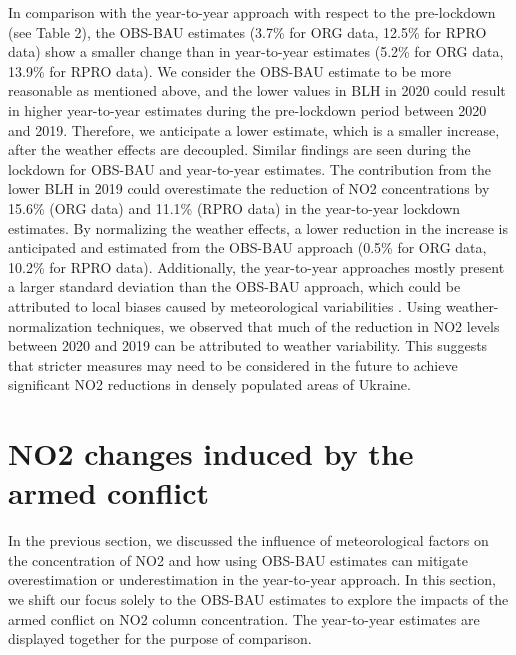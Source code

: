 In comparison with the year-to-year approach with respect to the pre-lockdown (see Table 2), the OBS-BAU estimates (3.7\% for ORG data, 12.5\% for RPRO data) show a smaller change than in year-to-year estimates (5.2\% for ORG data, 13.9\% for RPRO data). We consider the OBS-BAU estimate to be more reasonable as mentioned above, and the lower values in BLH in 2020 could result in higher year-to-year estimates during the pre-lockdown period between 2020 and 2019. Therefore, we anticipate a lower estimate, which is a smaller increase, after the weather effects are decoupled. Similar findings are seen during the lockdown for OBS-BAU and year-to-year estimates. The contribution from the lower BLH in 2019 could overestimate the reduction of NO2 concentrations by 15.6\% (ORG data) and 11.1\% (RPRO data) in the year-to-year lockdown estimates. By normalizing the weather effects, a lower reduction in the increase is anticipated and estimated from the OBS-BAU approach (0.5\% for ORG data, 10.2\% for RPRO data). Additionally, the year-to-year approaches mostly present a larger standard deviation than the OBS-BAU approach, which could be attributed to local biases caused by meteorological variabilities \citep{barre2021estimating}. Using weather-normalization techniques, we observed that much of the reduction in NO2 levels between 2020 and 2019 can be attributed to weather variability. This suggests that stricter measures may need to be considered in the future to achieve significant NO2 reductions in densely populated areas of Ukraine.\par
\section{NO2 changes induced by the armed conflict} \label{chap3_war}
In the previous section, we discussed the influence of meteorological factors on the concentration of NO2 and how using OBS-BAU estimates can mitigate overestimation or underestimation in the year-to-year approach. In this section, we shift our focus solely to the OBS-BAU estimates to explore the impacts of the armed conflict on NO2 column concentration. The year-to-year estimates are displayed together for the purpose of comparison.\par

